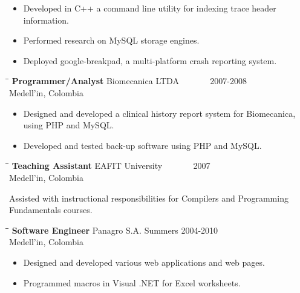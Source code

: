 \documentclass{res}
\begin{document}
\begin{resume}
   \begin{itemize}
       \item Developed in C++ a command line utility for indexing trace header information.
       \item Performed research on MySQL storage engines.
       \item Deployed google-breakpad, a multi-platform crash reporting system.
   \end{itemize}

   
   \begin{tabbing}
   \hspace{2.3in}\= \hspace{2.6in}\= \kill %
    {\bf Programmer/Analyst} \>Biomecanica LTDA\> ~~~~~~ 2007-2008\\
                             \>Medell\a'in, Colombia
   \end{tabbing}\vspace{-5pt}      %

   \begin{itemize}
       \item Designed and developed a clinical history report system for Biomecanica, using PHP and MySQL.
       \item Developed and tested back-up software using PHP and MySQL.
   \end{itemize}

   \begin{tabbing}
   \hspace{2.3in}\= \hspace{2.6in}\= \kill %
    {\bf Teaching Assistant} \>EAFIT University\> ~~~~~~ 2007\\
                          \>Medell\a'in, Colombia
   \end{tabbing}\vspace{-5pt}
    Assisted with instructional responsibilities for Compilers and Programming Fundamentals courses.
   
   \begin{tabbing}%
   \hspace{2.3in}\= \hspace{2.6in}\= \kill %
   {\bf Software Engineer}\> Panagro S.A.\> Summers  2004-2010\\
                          \>Medell\a'in, Colombia
   \end{tabbing}\vspace{-5pt}
   \begin{itemize}
        \item Designed and developed various web applications and web pages.  
        \item Programmed macros in Visual .NET for Excel worksheets.
   \end{itemize}


\end{resume}
\end{document}
